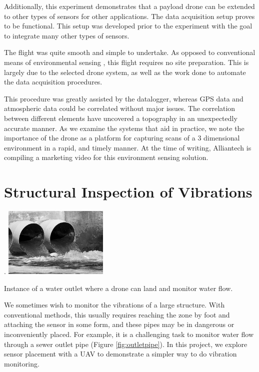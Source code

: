Additionally, this experiment demonstrates that a payload drone can be extended to other types of sensors for other applications. The data acquisition setup proves to be functional. This setup was developed prior to the experiment with the goal to integrate many other types of sensors. 

The flight was quite smooth and simple to undertake. As opposed to conventional means of environmental sensing \cite{xiang_xia_zhang_2020}, this flight requires no site preparation. This is largely due to the selected drone system, as well as the work done to automate the data acquisition procedures.

This procedure was greatly assisted by the datalogger, whereas GPS data and atmospheric data could be correlated without major issues. The correlation between different elements have uncovered a topography in an unexpectedly accurate manner. As we examine the systems that aid in practice, we note the importance of the drone as a platform for capturing scans of a 3 dimensional environment in a rapid, and timely manner. At the time of writing, Alliantech is compiling a marketing video for this environment sensing solution.


\pagebreak
\section{Structural Inspection of Vibrations}\label{section:vibrations}

\begin{marginfigure}%
    \raggedright. 
    \includegraphics[width=5cm]{images/stage_system/water-outlet_bw.jpg}
    \caption{Instance of a water outlet where a drone can land and monitor water flow.}
    \label{fig:outletpipe}
\end{marginfigure}    

We sometimes wish to monitor the vibrations of a large structure. With conventional methods, this usually requires reaching the zone by foot and attaching the sensor in some form, and these pipes may be in dangerous or inconveniently placed. For example, it is a challenging task to monitor water flow through a sewer outlet pipe (Figure \ref{fig:outletpipe}). In this project, we explore sensor placement with a UAV to demonstrate a simpler way to do vibration monitoring. 

